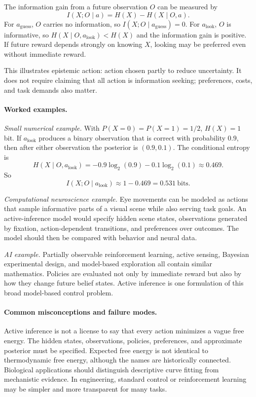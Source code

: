 The information gain from a future observation \(O\) can be measured by
\[
I(X;O\mid a)
=H(X)-H(X\mid O,a).
\]
For \(a_{\mathrm{guess}}\), \(O\) carries no information, so \(I(X;O\mid a_{\mathrm{guess}})=0\). For \(a_{\mathrm{look}}\), \(O\) is informative, so \(H(X\mid O,a_{\mathrm{look}})<H(X)\) and the information gain is positive. If future reward depends strongly on knowing \(X\), looking may be preferred even without immediate reward.

This illustrates epistemic action: action chosen partly to reduce uncertainty. It does not require claiming that all action is information seeking; preferences, costs, and task demands also matter.

\paragraph{Worked examples.}
\emph{Small numerical example.}
With \(P(X=0)=P(X=1)=1/2\), \(H(X)=1\) bit. If \(a_{\mathrm{look}}\) produces a binary observation that is correct with probability \(0.9\), then after either observation the posterior is \((0.9,0.1)\). The conditional entropy is
\[
H(X\mid O,a_{\mathrm{look}})
=-0.9\log_2(0.9)-0.1\log_2(0.1)
\approx0.469.
\]
So
\[
I(X;O\mid a_{\mathrm{look}})
\approx1-0.469=0.531\ \text{bits}.
\]

\emph{Computational neuroscience example.}
Eye movements can be modeled as actions that sample informative parts of a visual scene while also serving task goals. An active-inference model would specify hidden scene states, observations generated by fixation, action-dependent transitions, and preferences over outcomes. The model should then be compared with behavior and neural data.

\emph{AI example.}
Partially observable reinforcement learning, active sensing, Bayesian experimental design, and model-based exploration all contain similar mathematics. Policies are evaluated not only by immediate reward but also by how they change future belief states. Active inference is one formulation of this broad model-based control problem.

\paragraph{Common misconceptions and failure modes.}
Active inference is not a license to say that every action minimizes a vague free energy. The hidden states, observations, policies, preferences, and approximate posterior must be specified. Expected free energy is not identical to thermodynamic free energy, although the names are historically connected. Biological applications should distinguish descriptive curve fitting from mechanistic evidence. In engineering, standard control or reinforcement learning may be simpler and more transparent for many tasks.

